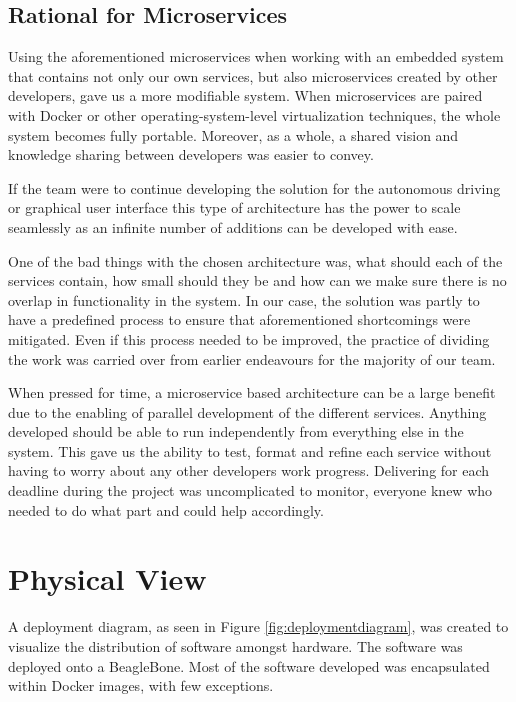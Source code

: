 \documentclass[12pt]{article}
\begin{document}
\subsection {Rational for Microservices} \label{microservice rationale}

Using the aforementioned microservices when working with an embedded system that contains not only our own services, but also microservices created by other developers, gave us a more modifiable system. When microservices are paired with Docker or other operating-system-level virtualization techniques, the whole system becomes fully portable. Moreover, as a whole, a shared vision and knowledge sharing between developers was easier to convey. 

If the team were to continue developing the solution for the autonomous driving or graphical user interface this type of architecture has the power to scale seamlessly as an infinite number of additions can be developed with ease.

One of the bad things with the chosen architecture was, what should each of the services contain, how small should they be and how can we make sure there is no overlap in functionality in the system. In our case, the solution was partly to have a predefined process to ensure that aforementioned shortcomings were mitigated. Even if this process needed to be improved, the practice of dividing the work was carried over from earlier endeavours for the majority of our team. 

When pressed for time, a microservice based architecture can be a large benefit due to the enabling of parallel development of the different services. Anything developed should be able to run independently from everything else in the system. This gave us the ability to test, format and refine each service without having to worry about any other developers work progress. Delivering for each deadline during the project was uncomplicated to monitor, everyone knew who needed to do what part and could help accordingly.
\pagebreak

\section{Physical View}
A deployment diagram, as seen in Figure \ref{fig:deploymentdiagram}, was created to visualize the distribution of software amongst hardware. The software was deployed onto a BeagleBone. Most of the software developed was encapsulated within Docker images, with few exceptions. \par
\end{document}
